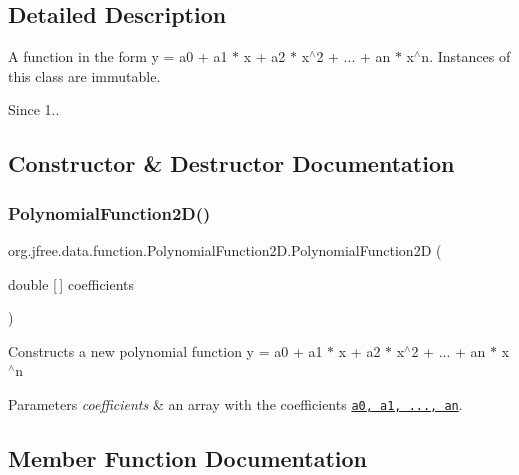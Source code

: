 \subsection{Detailed Description}
A function in the form {\ttfamily y = a0 + a1 $\ast$ x + a2 $\ast$ x$^\wedge$2 + ... + an $\ast$ x$^\wedge$n}. Instances of this class are immutable.

\begin{DoxySince}{Since}
1.. 
\end{DoxySince}


\subsection{Constructor \& Destructor Documentation}
\mbox{\label{classorg_1_1jfree_1_1data_1_1function_1_1_polynomial_function2_d_a8a04cd83facaa62905a6945392eed333}} 
\subsubsection{\texorpdfstring{Polynomial\+Function2\+D()}{PolynomialFunction2D()}}
{\footnotesize\ttfamily org.\+jfree.\+data.\+function.\+Polynomial\+Function2\+D.\+Polynomial\+Function2D (\begin{DoxyParamCaption}\item[{double \mbox{[}$\,$\mbox{]}}]{coefficients }\end{DoxyParamCaption})}

Constructs a new polynomial function {\ttfamily y = a0 + a1 $\ast$ x + a2 $\ast$ x$^\wedge$2 + ... + an $\ast$ x$^\wedge$n}


\begin{DoxyParams}{Parameters}
{\em coefficients} & an array with the coefficients \href{code>null</code> not permitted}{\tt a0, a1, ..., an}. \\
\hline
\end{DoxyParams}


\subsection{Member Function Documentation}
\mbox{\label{classorg_1_1jfree_1_1data_1_1function_1_1_polynomial_function2_d_a1a6d629379d32a9f653a8d2a72bea25c}} 
